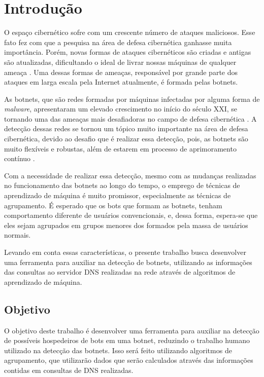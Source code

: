 \chapter{Introdução}
O espaço cibernético sofre com um crescente número de ataques maliciosos. Esse fato fez com que a pesquisa na área de defesa cibernética ganhasse muita importância. Porém, novas formas de ataques cibernéticos são criadas e antigas são atualizadas, dificultando o ideal de livrar nossas máquinas de qualquer ameaça \citep{bharathula2016equitable}. Uma dessas formas de ameaças, responsável por grande parte dos ataques em larga escala pela Internet atualmente, é formada pelas botnets.

As botnets, que são redes formadas por máquinas infectadas por alguma forma de \textit{malware}, apresentaram um elevado crescimento no início do século XXI, se tornando uma das ameaças mais desafiadoras no campo de defesa cibernética \citep{chang2015measuring}. A detecção dessas redes se tornou um tópico muito importante na área de defesa cibernética, devido ao desafio que é realizar essa detecção, pois, as botnets são muito flexíveis e robustas, além de estarem em processo de aprimoramento contínuo \citep{bu2010new}.

Com a necessidade de realizar essa detecção, mesmo com as mudanças realizadas no funcionamento das botnets ao longo do tempo, o emprego de técnicas de aprendizado de máquina é muito promissor, especialmente as técnicas de agrupamento. É esperado que os bots que formam as botnets, tenham comportamento diferente de usuários convencionais, e, dessa forma, espera-se que eles sejam agrupados em grupos menores dos formados pela massa de usuários normais.

Levando em conta essas características, o presente trabalho busca desenvolver uma ferramenta para auxiliar na detecção de botnets, utilizando as informações das consultas ao servidor DNS realizadas na rede através de algoritmos de aprendizado de máquina.

\section{Objetivo}
O objetivo deste trabalho é desenvolver uma ferramenta para auxiliar na detecção de possíveis hospedeiros de bots em uma botnet, reduzindo o trabalho humano utilizado na detecção das botnets. Isso será feito utilizando algoritmos de agrupamento, que utilizarão dados que serão calculados através das informações contidas em consultas de DNS realizadas. 

